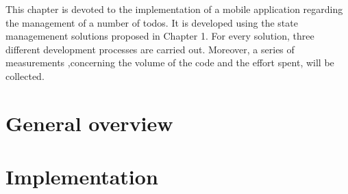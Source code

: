 This chapter is devoted to the implementation of a mobile application regarding the management of a number of todos. It is developed using the state managemenent solutions proposed in Chapter 1. For every solution, three different development processes are carried out. Moreover, a series of measurements ,concerning the volume of the code and the effort spent, will be collected.
\section{General overview}
\label{sec:general_overview}


\section{Implementation}
\label{sec:implementation}

